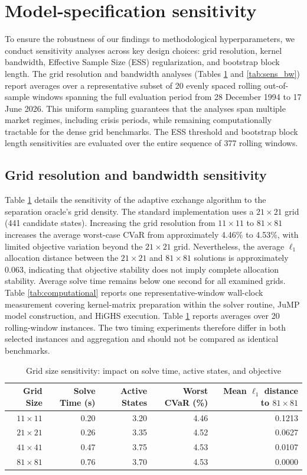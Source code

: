 \documentclass[11pt, a4paper]{article}
\begin{document}
\section{Model-specification sensitivity}
\label{sec:sensitivity}
To ensure the robustness of our findings to methodological hyperparameters, we conduct sensitivity analyses across key design choices: grid resolution, kernel bandwidth, Effective Sample Size (ESS) regularization, and bootstrap block length. The grid resolution and bandwidth analyses (Tables \ref{tab:sens_grid} and \ref{tab:sens_bw}) report averages over a representative subset of 20 evenly spaced rolling out-of-sample windows spanning the full evaluation period from 28 December 1994 to 17 June 2026. This uniform sampling guarantees that the analyses span multiple market regimes, including crisis periods, while remaining computationally tractable for the dense grid benchmarks. The ESS threshold and bootstrap block length sensitivities are evaluated over the entire sequence of 377 rolling windows.

\subsection{Grid resolution and bandwidth sensitivity}
Table \ref{tab:sens_grid} details the sensitivity of the adaptive exchange algorithm to the separation oracle's grid density. The standard implementation uses a $21\times21$ grid (441 candidate states). Increasing the grid resolution from $11\times11$ to $81\times81$ increases the average worst-case CVaR from approximately 4.46\% to 4.53\%, with limited objective variation beyond the $21\times21$ grid. Nevertheless, the average $\ell_1$ allocation distance between the $21\times21$ and $81\times81$ solutions is approximately 0.063, indicating that objective stability does not imply complete allocation stability. Average solve time remains below one second for all examined grids. Table \ref{tab:computational} reports one representative-window wall-clock measurement covering kernel-matrix preparation within the solver routine, JuMP model construction, and HiGHS execution. Table \ref{tab:sens_grid} reports averages over 20 rolling-window instances. The two timing experiments therefore differ in both selected instances and aggregation and should not be compared as identical benchmarks.

\begin{table}[htbp]
\centering
\caption{Grid size sensitivity: impact on solve time, active states, and objective}
\label{tab:sens_grid}
\begin{tabular}{rrrrr}
\toprule
\textbf{Grid Size} & \textbf{Solve Time (s)} & \textbf{Active States} & \textbf{Worst CVaR (\%)} & \textbf{Mean $\ell_1$ distance to $81\times81$} \\
\midrule
$11\times11$ & 0.20 & 3.20 & 4.46 & 0.1213 \\
$21\times21$ & 0.26 & 3.35 & 4.52 & 0.0627 \\
$41\times41$ & 0.47 & 3.75 & 4.53 & 0.0107 \\
$81\times81$ & 0.76 & 3.70 & 4.53 & 0.0000 \\
\bottomrule
\end{tabular}
\end{table}
\end{document}
